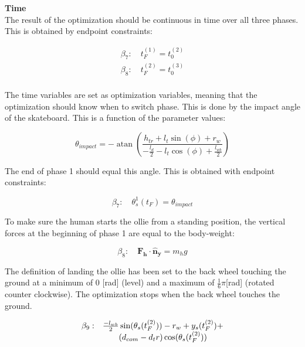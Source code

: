\documentclass[default,iicol]{sn-jnl}
\begin{document}
\textbf{Time}\\
The result of the optimization should be continuous in time over all three phases. This is obtained by endpoint constraints: 

\begin{equation}
    \begin{array}{c}
         \beta_7: \quad t_F^{(1)} = t_0^{(2)}  \\
         \beta_8: \quad t_F^{(2)} = t_0^{(3)}  \\
    \end{array}
\end{equation}

The time variables are set as optimization variables, meaning that the optimization should know when to switch phase. This is done by the impact angle of the skateboard. This is a function of the parameter values:

\begin{equation}
    \theta_{impact} = -\operatorname{atan}\left(\frac{h_{t r}+l_t \sin (\phi)+r_w}{-\frac{l_d}{2}-l_t \cos (\phi)+\frac{l_{w b}}{2}}\right)
\end{equation}

The end of phase 1 should equal this angle. This is obtained with endpoint constraints:

\begin{equation}
    \beta_7: \quad \theta_s^{1}(t_F) = \theta_{impact}
\end{equation}

To make sure the human starts the ollie from a standing position, the vertical forces at the beginning of phase 1 are equal to the body-weight:

\begin{equation}
    \beta_8: \quad \mathbf{F_h} \cdot \mathbf{\hat n_y} = m_h g
\end{equation}

The definition of landing the ollie has been set to the back wheel touching the ground at a minimum of 0 [rad] (level) and a maximum of $\frac{1}{6} \pi$[rad] (rotated counter clockwise). The optimization stops when the back wheel touches the ground.

\begin{equation}
\begin{array}{l c}
\beta_9 : & \frac{-l_{wb}}{2} \sin(\theta_s(t_F^{(2)})) - r_w + y_s(t_F^{(2)}) + \\ 
& (d_{com} - {d_tr}) \cos(\theta_s(t_F^{(2)}))
\end{array}
\end{equation}
\end{document}
